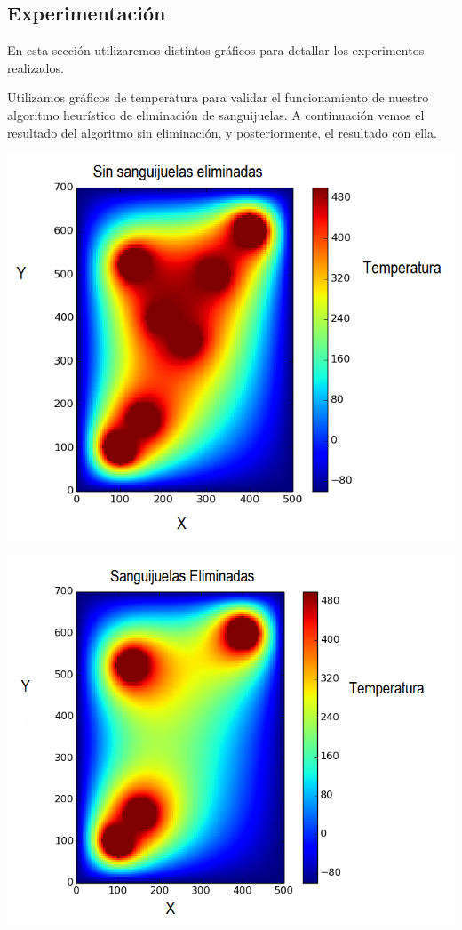 \subsection{Experimentación}

	En esta sección utilizaremos distintos gráficos para detallar los experimentos realizados. 

	Utilizamos gráficos de temperatura para validar el funcionamiento de nuestro algoritmo heurístico de eliminación de sanguijuelas. A continuación vemos el resultado del algoritmo sin eliminación, y posteriormente, el resultado con ella.

	\begin{center}
		\includegraphics[width=\textwidth]{./img/test5_sinkill.png}
	\end{center}

	\begin{center}
		\includegraphics[width=\textwidth]{./img/test5_conkill.png}
	\end{center}

